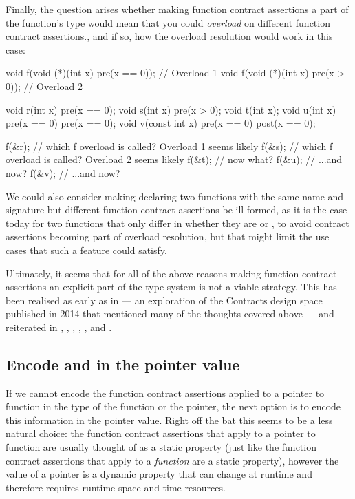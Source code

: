 Finally, the question arises whether making function contract assertions a part of the function's type would mean that you could \emph{overload} on different function contract assertions., and if so, how the overload resolution would work in this case:
\begin{codeblock}
void f(void (*)(int x) pre(x == 0));  // Overload 1
void f(void (*)(int x) pre(x > 0));   // Overload 2

void r(int x) pre(x == 0);
void s(int x) pre(x > 0);
void t(int x);
void u(int x) pre(x == 0) pre(x == 0);
void v(const int x) pre(x == 0) post(x == 0);

f(&r);  // which f overload is called? Overload 1 seems likely
f(&s);  // which f overload is called? Overload 2 seems likely
f(&t);  // now what?
f(&u);  // ...and now?
f(&v);  // ...and now?
\end{codeblock}
We could also consider making declaring two functions with the same name and signature but different function contract assertions be ill-formed, as it is the case today for two functions that only differ in whether they are  or , to avoid contract assertions becoming part of overload resolution, but that might limit the use cases that such a feature could satisfy.

Ultimately, it seems that for all of the above reasons making function contract assertions an explicit part of the type system is not a viable strategy. This has been realised as early as in \cite{N4110} --- an exploration of the Contracts design space published in 2014 that mentioned many of the thoughts covered above --- and reiterated in \cite{N4415}, \cite{P0246R0}, \cite{P0247R0}, \cite{P0287R0}, \cite{P0380R1}, and \cite{P0542R5}.

\subsection{Encode  and  in the pointer value}
\label{subsec:makevalue}

If we cannot encode the function contract assertions applied to a pointer to function in the type of the function or the pointer, the next option is to encode this information in the pointer value. Right off the bat this seems to be a less natural choice: the function contract assertions that apply to a pointer to function are usually thought of as a static property (just like the function contract assertions that apply to a \emph{function} are a static property), however the value of a pointer is a dynamic property that can change at runtime and therefore requires runtime space and time resources.

